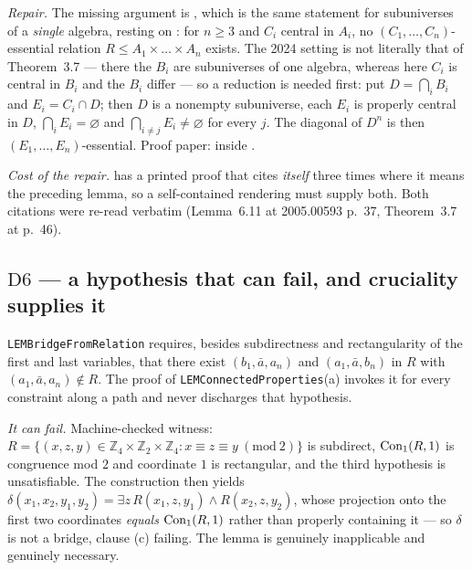 \emph{Repair.} The missing argument is \cite[Thm.~3.7]{ZhukStrong}, which is
the same statement for subuniverses of a \emph{single} algebra, resting on
\cite[Lem.~6.11]{ZhukStrong}: for $n\ge3$ and $C_{i}$ central in $A_{i}$, no
$(C_{1},\dots,C_{n})$-essential relation $R\le A_{1}\times\dots\times A_{n}$
exists. The 2024 setting is not literally that of Theorem~3.7 --- there the
$B_{i}$ are subuniverses of one algebra, whereas here $C_{i}$ is central in
$B_{i}$ and the $B_{i}$ differ --- so a reduction is needed first: put
$D=\bigcap_{i}B_{i}$ and $E_{i}=C_{i}\cap D$; then $D$ is a nonempty
subuniverse, each $E_{i}$ is properly central in $D$, $\bigcap_{i}E_{i}
=\varnothing$ and $\bigcap_{i\neq j}E_{i}\neq\varnothing$ for every $j$. The
diagonal of $D^{n}$ is then $(E_{1},\dots,E_{n})$-essential. Proof paper:
inside .

\emph{Cost of the repair.} \cite[Lem.~6.11]{ZhukStrong} has a printed proof
that cites \emph{itself} three times where it means the preceding lemma, so a
self-contained rendering must supply both. Both citations were re-read verbatim
(Lemma~6.11 at 2005.00593 p.~37, Theorem~3.7 at p.~46).

\subsection{$\mathrm D6$ --- a hypothesis that can fail, and cruciality supplies it}
\label{sec:D6}

\texttt{LEMBridgeFromRelation} requires, besides subdirectness and
rectangularity of the first and last variables, that there exist
$(b_{1},\bar a,a_{n})$ and $(a_{1},\bar a,b_{n})$ in $R$ with
$(a_{1},\bar a,a_{n})\notin R$. The proof of \texttt{LEMConnectedProperties}(a)
invokes it for every constraint along a path and never discharges that
hypothesis.

\emph{It can fail.} Machine-checked witness:
$R=\{(x,z,y)\in\mathbb Z_{4}\times\mathbb Z_{2}\times\mathbb Z_{4}:
x\equiv z\equiv y\ (\mathrm{mod}\ 2)\}$ is subdirect, $\operatorname{Con}_1(R,1)$ is
congruence mod $2$ and coordinate $1$ is rectangular, and the third hypothesis
is unsatisfiable. The construction then yields
$\delta(x_{1},x_{2},y_{1},y_{2})=\exists z\,R(x_{1},z,y_{1})\wedge
R(x_{2},z,y_{2})$, whose projection onto the first two coordinates
\emph{equals} $\operatorname{Con}_1(R,1)$ rather than properly containing it --- so $\delta$
is not a bridge, clause (c) failing. The lemma is genuinely inapplicable and
genuinely necessary.

